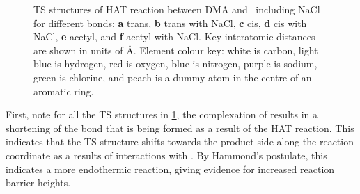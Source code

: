 \begin{doublespace}
\begin{figure}[!htbp]\ContinuedFloat
  \setcounter{subfigure}{4}

  \caption[TS structures of HAT reaction between DMA and \cumo\ including and
  excluding NaCl.]{TS structures of HAT reaction between DMA and \cumo\
  including NaCl for different  bonds: \textbf{a} trans, \textbf{b}
  trans with NaCl, \textbf{c} cis, \textbf{d} cis with NaCl, \textbf{e} acetyl,
  and \textbf{f} acetyl with NaCl. Key interatomic distances are shown in units
  of \AA. Element colour key: white is carbon, light blue is hydrogen, red is
  oxygen, blue is nitrogen, purple is sodium, green is chlorine, and peach is a
  dummy atom in the centre of an aromatic ring.}
  \label{fig:dma-cumo-ts}
\end{figure}

First, note for all the TS structures in \ref{fig:dma-cumo-ts}, the complexation
of \ch{NaCl} results in a shortening of the \ch{O-H} bond that is being formed
as a result of the HAT reaction. This indicates that the TS structure shifts
towards the product side along the reaction coordinate as a results of
interactions with \ch{NaCl}. By Hammond's postulate,\cite{Hammond1955} this
indicates a more endothermic reaction, giving evidence for increased reaction
barrier heights.


\end{doublespace}

